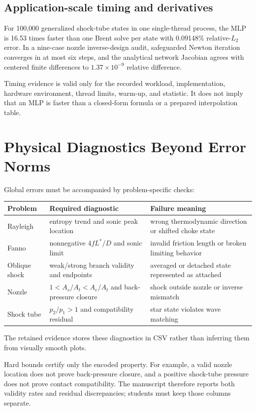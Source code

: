 \documentclass[11pt]{article}
\begin{document}
\subsection{Application-scale timing and derivatives}
For 100,000 generalized shock-tube states in one single-thread process, the MLP
is 16.53 times faster than one Brent solve per state with 0.09148\% relative-$L_2$
error. In a nine-case nozzle inverse-design audit, safeguarded Newton iteration
converges in at most six steps, and the analytical network Jacobian agrees with
centered finite differences to $1.37\times10^{-9}$ relative difference.

\begin{warningbox}
Timing evidence is valid only for the recorded workload, implementation,
hardware environment, thread limits, warm-up, and statistic. It does not imply
that an MLP is faster than a closed-form formula or a prepared interpolation table.
\end{warningbox}

\section{Physical Diagnostics Beyond Error Norms}
Global errors must be accompanied by problem-specific checks:
\begin{center}
\begin{tabular}{p{}p{}p{}}
\toprule
Problem & Required diagnostic & Failure meaning \\
\midrule
Rayleigh & entropy trend and sonic peak location & wrong thermodynamic direction or shifted choke state \\
Fanno & nonnegative $4fL^*/D$ and sonic limit & invalid friction length or broken limiting behavior \\
Oblique shock & weak/strong branch validity and endpoints & averaged or detached state represented as attached \\
Nozzle & $1<A_s/A_t<A_e/A_t$ and back-pressure closure & shock outside nozzle or inverse mismatch \\
Shock tube & $p_2/p_1>1$ and compatibility residual & star state violates wave matching \\
\bottomrule
\end{tabular}
\end{center}
The retained evidence stores these diagnostics in CSV rather than inferring them
from visually smooth plots.

Hard bounds certify only the encoded property. For example, a valid nozzle
location does not prove back-pressure closure, and a positive shock-tube pressure
does not prove contact compatibility. The manuscript therefore reports both
validity rates and residual discrepancies; students must keep those columns separate.
\end{document}
